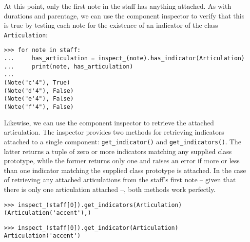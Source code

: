 \noindent At this point, only the first note in the staff has anything
attached. As with durations and parentage, we can use the component inspector
to verify that this is true by testing each note for the existence of an
indicator of the class \texttt{Articulation}:

\begin{comment}
<abjad>
for note in staff:
    has_articulation = inspect_(note).has_indicator(Articulation)
    print(note, has_articulation)

</abjad>
\end{comment}

\begin{abjadbookoutput}
\begin{singlespacing}
\vspace{-0.5\baselineskip}
\begin{verbatim}
>>> for note in staff:
...     has_articulation = inspect_(note).has_indicator(Articulation)
...     print(note, has_articulation)
...
(Note("c'4"), True)
(Note("d'4"), False)
(Note("e'4"), False)
(Note("f'4"), False)
\end{verbatim}
\end{singlespacing}
\end{abjadbookoutput}

\noindent Likewise, we can use the component inspector to retrieve the attached
articulation. The inspector provides two methods for retrieving indicators
attached to a single component: \texttt{get\_indicator()} and
\texttt{get\_indicators()}. The latter returns a tuple of zero or more
indicators matching any supplied class prototype, while the former returns only
one and raises an error if more or less than one indicator matching the
supplied class prototype is attached. In the case of retrieving any attached
articulations from the staff's first note -- given that there is only one
articulation attached --, both methods work perfectly.

\begin{comment}
<abjad>[allow_exceptions]
inspect_(staff[0]).get_indicators(Articulation)
inspect_(staff[0]).get_indicator(Articulation)
</abjad>
\end{comment}

\begin{abjadbookoutput}
\begin{singlespacing}
\vspace{-0.5\baselineskip}
\begin{verbatim}
>>> inspect_(staff[0]).get_indicators(Articulation)
(Articulation('accent'),)
\end{verbatim}
\begin{verbatim}
>>> inspect_(staff[0]).get_indicator(Articulation)
Articulation('accent')
\end{verbatim}
\end{singlespacing}
\end{abjadbookoutput}

